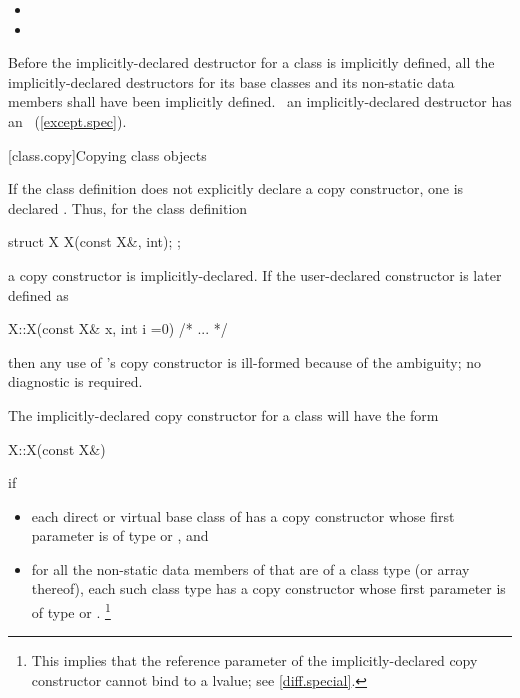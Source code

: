 \documentclass[american]{book}
\begin{document}
\begin{paras}
\begin{itemize}
\item
{}
\item
{}
\end{itemize}

Before the implicitly-declared destructor for a class is implicitly defined,
all the implicitly-declared destructors for its base classes and
its non-static data members shall have been implicitly defined.
\enternote\ 
an implicitly-declared destructor has an
~(\ref{except.spec}).
\exitnote\ 

\setcounter{section}{7}
[class.copy]{Copying class objects}

\setcounter{Paras}{3}
\pnum
{}%
If the class definition does not explicitly declare a copy constructor,
one is declared
. 
Thus, for the class definition

\begin{codeblock}
struct X {
	X(const X&, int);
};
\end{codeblock}

a copy constructor is implicitly-declared.
If the user-declared constructor is later defined as

\begin{codeblock}
X::X(const X& x, int i =0) { /* ... */ }
\end{codeblock}

then any use of
's
copy constructor is ill-formed because of the ambiguity;
no diagnostic is required.

\setcounter{Paras}{4}
\pnum
The implicitly-declared copy constructor for a class
will have the form

\begin{codeblock}
X::X(const X&)
\end{codeblock}

if

\begin{itemize}
\item
each direct or virtual base class
of
has a copy constructor whose first parameter is of type
or
,
and
\item
for all the non-static data members of
that are of a class type
(or array thereof),
each such class type has a copy constructor whose first parameter is of type
\tcode{const}
or
.%
\footnote{
This implies that the reference parameter of the
implicitly-declared copy constructor
cannot bind to a
lvalue; see \ref{diff.special}.
}
\end{itemize}


\end{paras}
\end{document}
